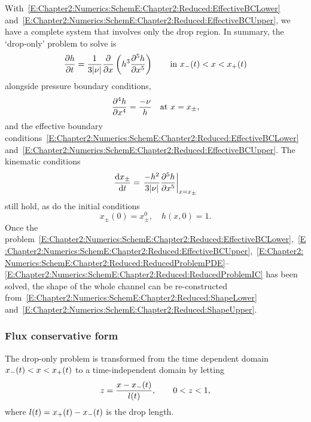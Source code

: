 With~\eqref{E:Chapter2:Numerics:SchemE:Chapter2:Reduced:EffectiveBCLower} and~\eqref{E:Chapter2:Numerics:SchemE:Chapter2:Reduced:EffectiveBCUpper}, we have a complete system that involves only the drop region. In summary, the `drop-only' problem to solve is
\begin{equation}\label{E:Chapter2:Numerics:SchemE:Chapter2:Reduced:ReducedProblemPDE}
\frac{\partial h}{\partial t} = \frac{1}{3|\nu|}\frac{\partial }{\partial x}\left(h^3 \frac{\partial ^5 h}{\partial x^5}\right) \qquad \text{in}~x_{-}(t) < x < x_{+}(t)
\end{equation}
alongside pressure boundary conditions,
\begin{equation}
\frac{\partial ^4 h}{\partial x^4} = \frac{-\nu}{h} \quad \text{at}~x = x_{\pm},
\end{equation}
and the effective boundary conditions~\eqref{E:Chapter2:Numerics:SchemE:Chapter2:Reduced:EffectiveBCLower} and~\eqref{E:Chapter2:Numerics:SchemE:Chapter2:Reduced:EffectiveBCUpper}. The kinematic conditions
\begin{equation}\label{E:Chapter2:Numerics:SchemE:Chapter2:Reduced:ReducedProblemKinematic}
\frac{\mathrm{d} x_{\pm}}{\mathrm{d} t} =\left. \frac{-h^2}{3|\nu|}\frac{\partial ^5 h}{\partial x^5}\right|_{x = x_{\pm}}
\end{equation}
still hold, as do the initial conditions
\begin{equation}\label{E:Chapter2:Numerics:SchemE:Chapter2:Reduced:ReducedProblemIC}
 x_{\pm}(0) = x_\pm^0, \quad h(x,0) = 1.
\end{equation}
Once the problem~\eqref{E:Chapter2:Numerics:SchemE:Chapter2:Reduced:EffectiveBCLower},~\eqref{E:Chapter2:Numerics:SchemE:Chapter2:Reduced:EffectiveBCUpper},~\eqref{E:Chapter2:Numerics:SchemE:Chapter2:Reduced:ReducedProblemPDE}--\eqref{E:Chapter2:Numerics:SchemE:Chapter2:Reduced:ReducedProblemIC} has been solved, the shape of the whole channel can be re-constructed from~\eqref{E:Chapter2:Numerics:SchemE:Chapter2:Reduced:ShapeLower} and~\eqref{E:Chapter2:Numerics:SchemE:Chapter2:Reduced:ShapeUpper}.

\subsubsection{Flux conservative form}
The drop-only problem is transformed from the time dependent domain $x_{-}(t) < x < x_{+}(t)$ to a time-independent domain by letting
\begin{equation}\label{E:Chapter2:Numerics:SchemE:Chapter2:FluxConservativE:Chapter2:SpaceScaling}
z = \frac{x - x_{-}(t)}{l(t)}, \qquad 0 < z < 1,
\end{equation}
where $l(t) = x_{+}(t) - x_{-}(t)$ is the drop length.

